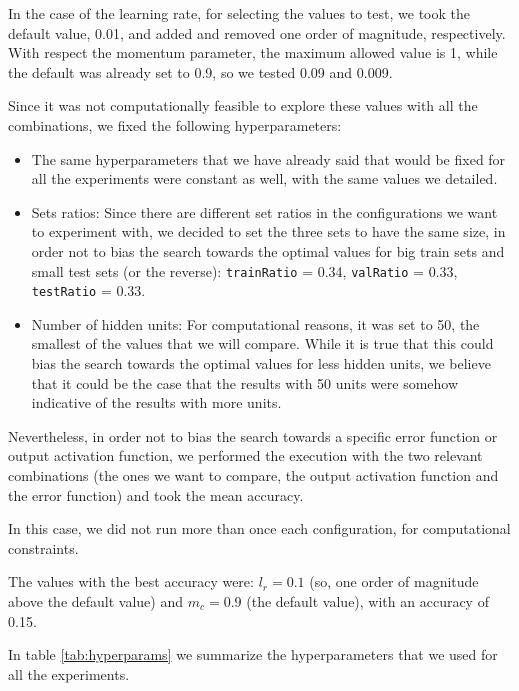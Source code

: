 \documentclass{article}[11pt]
\begin{document}
In the case of the learning rate, for selecting the values to test, we took the default value, 0.01, and added and removed one order of magnitude, respectively. With respect the momentum parameter, the maximum allowed value is 1, while the default was already set to 0.9, so we tested 0.09 and 0.009.

Since it was not computationally feasible to explore these values with all the combinations, we fixed the following hyperparameters:
\begin{itemize}
    \item The same hyperparameters that we have already said that would be fixed for all the experiments were constant as well, with the same values we detailed.
    \item Sets ratios: Since there are different set ratios in the configurations we want to experiment with, we decided to set the three sets to have the same size, in order not to bias the search towards the optimal values for big train sets and small test sets (or the reverse): \texttt{trainRatio} = 0.34, \texttt{valRatio} = 0.33, \texttt{testRatio} = 0.33.
    \item Number of hidden units: For computational reasons, it was set to 50, the smallest of the values that we will compare. While it is true that this could bias the search towards the optimal values for less hidden units, we believe that it could be the case that the results with 50 units were somehow indicative of the results with more units.
\end{itemize}
Nevertheless, in order not to bias the search towards a specific error function or output activation function, we performed the execution with the two relevant combinations (the ones we want to compare, the output activation function and the error function) and took the mean accuracy.

In this case, we did not run more than once each configuration, for computational constraints. 

The values with the best accuracy were: $l_r = 0.1$ (so, one order of magnitude above the default value) and $m_c = 0.9$ (the default value), with an accuracy of 0.15.


In table \ref{tab:hyperparams} we summarize the hyperparameters that we used for all the experiments.
\end{document}
